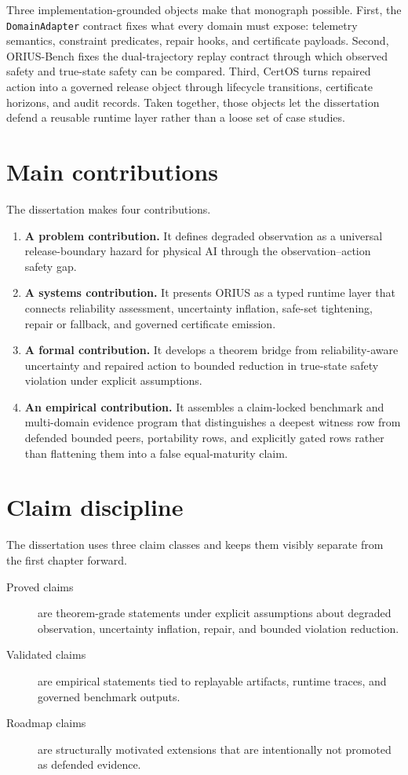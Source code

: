 Three implementation-grounded objects make that monograph possible. First, the
\texttt{DomainAdapter} contract fixes what every domain must expose: telemetry semantics,
constraint predicates, repair hooks, and certificate payloads. Second, ORIUS-Bench fixes the
dual-trajectory replay contract through which observed safety and true-state safety can be
compared. Third, CertOS turns repaired action into a governed release object through lifecycle
transitions, certificate horizons, and audit records. Taken together, those objects let the
dissertation defend a reusable runtime layer rather than a loose set of case studies.

\section{Main contributions}
The dissertation makes four contributions.
\begin{enumerate}
  \item \textbf{A problem contribution.} It defines degraded observation as a universal
  release-boundary hazard for physical AI through the observation--action safety gap.
  \item \textbf{A systems contribution.} It presents ORIUS as a typed runtime layer that
  connects reliability assessment, uncertainty inflation, safe-set tightening, repair or
  fallback, and governed certificate emission.
  \item \textbf{A formal contribution.} It develops a theorem bridge from reliability-aware
  uncertainty and repaired action to bounded reduction in true-state safety violation under
  explicit assumptions.
  \item \textbf{An empirical contribution.} It assembles a claim-locked benchmark and
  multi-domain evidence program that distinguishes a deepest witness row from defended bounded
  peers, portability rows, and explicitly gated rows rather than flattening them into a false
  equal-maturity claim.
\end{enumerate}

\section{Claim discipline}
The dissertation uses three claim classes and keeps them visibly separate from the first chapter
forward.
\begin{description}
  \item[Proved claims] are theorem-grade statements under explicit assumptions about degraded
  observation, uncertainty inflation, repair, and bounded violation reduction.
  \item[Validated claims] are empirical statements tied to replayable artifacts, runtime traces,
  and governed benchmark outputs.
  \item[Roadmap claims] are structurally motivated extensions that are intentionally not promoted
  as defended evidence.
\end{description}

